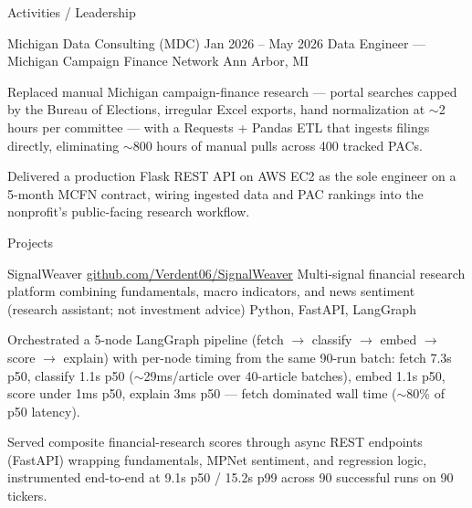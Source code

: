 \documentclass[
	11pt
]{../../../template}
\begin{document}
	\begin{rSection}{A}{ctivities / Leadership}
		\begin{rSectionEntry}
			{Michigan Data Consulting (MDC)}
			{Jan 2026 -- May 2026}
			{Data Engineer --- Michigan Campaign Finance Network}
			{}
			{Ann Arbor, MI}

			\item Replaced manual Michigan campaign-finance research --- portal searches capped by the Bureau of Elections, irregular Excel exports, hand normalization at $\sim$2 hours per committee --- with a Requests + Pandas ETL that ingests filings directly, eliminating $\sim$800 hours of manual pulls across 400 tracked PACs.
			\item Delivered a production Flask REST API on AWS EC2 as the sole engineer on a 5-month MCFN contract, wiring ingested data and PAC rankings into the nonprofit's public-facing research workflow.
		\end{rSectionEntry}
	\end{rSection}

	\begin{rSection}{P}{rojects}
		\begin{rSectionEntry}
			{SignalWeaver}
			{\href{https://github.com/Verdent06/SignalWeaver}{github.com/Verdent06/SignalWeaver}}
			{Multi-signal financial research platform combining fundamentals, macro indicators, and news sentiment (research assistant; not investment advice)}
			{Python, FastAPI, LangGraph}
			{}

			\item Orchestrated a 5-node LangGraph pipeline (fetch $\rightarrow$ classify $\rightarrow$ embed $\rightarrow$ score $\rightarrow$ explain) with per-node timing from the same 90-run batch: fetch 7.3s p50, classify 1.1s p50 ($\sim$29ms/article over 40-article batches), embed 1.1s p50, score under 1ms p50, explain 3ms p50 --- fetch dominated wall time ($\sim$80\% of p50 latency).
			\item Served composite financial-research scores through async REST endpoints (FastAPI) wrapping fundamentals, MPNet sentiment, and regression logic, instrumented end-to-end at 9.1s p50 / 15.2s p99 across 90 successful runs on 90 tickers.
		\end{rSectionEntry}
	\end{rSection}
\end{document}
